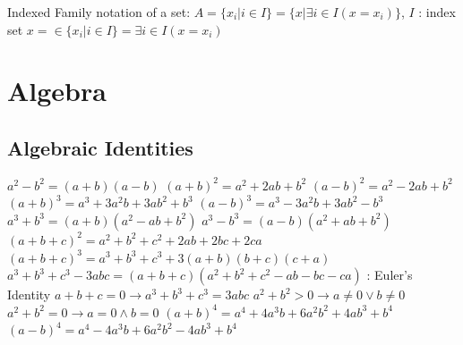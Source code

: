 \documentclass[12pt]{article}
\begin{document}
\begin{flushleft}
   Indexed Family notation of a set: \linebreak 
   \textbullet \quad $ A = \{ x_i | i \in I \} = \{ x | \exists i \in I (x = x_i) \} $, $I$  :  index set \linebreak
   \textbullet \quad $ x = \in \{ x_i | i \in I \} = \exists i \in I (x= x_i) $ \linebreak
   
   
	\pagebreak   
   
   
   \section{Algebra}
   
   \subsection{Algebraic Identities} 
   
   \textbullet \quad $ a^2 - b^2 = (a + b) (a - b) $ \linebreak
   \textbullet \quad $ (a + b)^2 = a^2 + 2ab + b^2 $ \linebreak 
   \textbullet \quad $ (a - b)^2 = a^2 - 2ab + b^2 $ \linebreak
   \textbullet \quad $ (a + b)^3 = a^3 + 3a^2b + 3ab^2 + b^3 $ \linebreak
   \textbullet \quad $ (a - b)^3 = a^3 - 3a^2b + 3ab^2 - b^3 $ \linebreak 
   \textbullet \quad $ a^3 + b^3 = (a + b) (a^2 - ab + b^2) $ \linebreak 
   \textbullet \quad $ a^3 - b^3 = (a - b) (a^2 + ab + b^2) $ \linebreak 
   \textbullet \quad $ (a + b + c)^2 = a^2 + b^2 + c^2 + 2ab +2bc +2ca$ \linebreak
   \textbullet \quad $ (a +b+c)^3 = a^3 + b^3 + c^3 + 3(a + b) (b + c) ( c + a) $ \linebreak
   \textbullet \quad $ a^3 + b^3 + c^3 -3abc = (a + b + c) (a^2 + b^2 + c^2 -ab -bc -ca) $  :  Euler's Identity \linebreak
   \textbullet \quad $ a + b + c = 0 \rightarrow a^3 + b^3 + c^3 = 3abc $ \linebreak 
   \textbullet \quad $ a^2 + b^2  > 0 \rightarrow a \neq 0 \lor b \neq 0 $ \linebreak
   \textbullet \quad $ a^2 + b^2 = 0 \rightarrow a = 0 \land b = 0 $ \linebreak
   \textbullet \quad $ (a + b)^4 = a^4 + 4a^3b + 6a^2b^2 + 4ab^3 + b^4 $ \linebreak 
   \textbullet \quad $ (a - b)^4 = a^4 - 4a^3b + 6a^2b^2 -4ab^3 + b^4 $ \linebreak 
   

\end{flushleft}
\end{document}
